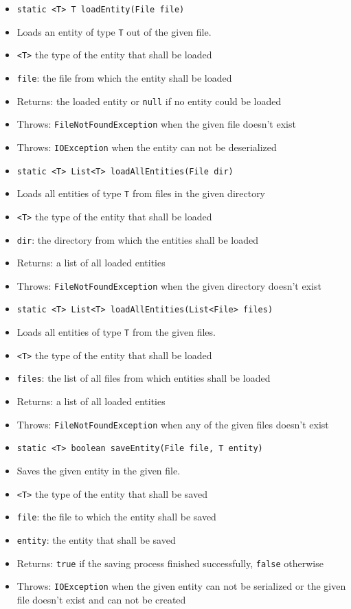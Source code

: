 \documentclass[parskip=full,11pt]{scrartcl}
\begin{document}
\begin{itemize}\itemsep -10pt
	\item \texttt{static <T> T loadEntity(File file)}
	\item[] Loads an entity of type \texttt{T} out of the given file.
	\item[] \texttt{<T>} the type of the entity that shall be loaded
	\item[] \texttt{file}: the file from which the entity shall be loaded
	\item[]Returns: the loaded entity or \texttt{null} if no entity could be loaded
	\item[]Throws: \texttt{FileNotFoundException} when the given file doesn't exist
	\item[]Throws: \texttt{IOException} when the entity can not be deserialized

	\item \texttt{static <T> List<T> loadAllEntities(File dir)}
	\item[] Loads all entities of type \texttt{T} from files in the given directory
	\item[] \texttt{<T>} the type of the entity that shall be loaded
	\item[] \texttt{dir}: the directory from which the entities shall be loaded
	\item[]Returns: a list of all loaded entities
	\item[]Throws: \texttt{FileNotFoundException} when the given directory doesn't exist

	\item \texttt{static <T> List<T> loadAllEntities(List<File> files)}
	\item[] Loads all entities of type \texttt{T} from the given files.
	\item[] \texttt{<T>} the type of the entity that shall be loaded
	\item[] \texttt{files}: the list of all files from which entities shall be loaded
	\item[]Returns: a list of all loaded entities
	\item[]Throws: \texttt{FileNotFoundException} when any of the given files doesn't exist

	\item \texttt{static <T> boolean saveEntity(File file, T entity)}
	\item[] Saves the given entity in the given file.
	\item[] \texttt{<T>} the type of the entity that shall be saved
	\item[] \texttt{file}: the file to which the entity shall  be saved
	\item[] \texttt{entity}: the entity that shall be saved
	\item[]Returns: \texttt{true} if the saving process finished successfully, \texttt{false} otherwise
	\item[] Throws: \texttt{IOException} when the given entity can not be serialized or the given file doesn't exist and can not be created
\end{itemize}
\end{document}
